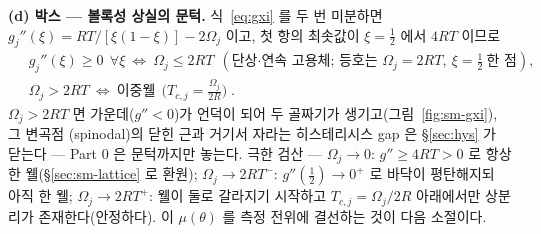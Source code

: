 \documentclass[11pt,a4paper]{article}
\begin{document}
\textbf{(d) 박스 --- 볼록성 상실의 문턱.} 식~\eqref{eq:gxi} 를 두 번 미분하면
$g_j''(\xi)=RT/[\xi(1-\xi)]-2\Omega_j$ 이고, 첫 항의 최솟값이 $\xi=\tfrac12$ 에서 $4RT$ 이므로
\begin{equation}
\boxed{\;
\begin{aligned}
&g_j''(\xi)\ge0\ \ \forall\xi\ \Longleftrightarrow\ \Omega_j\le2RT\ \ (\text{단상·연속 고용체; 등호는 }\Omega_j{=}2RT,\ \xi{=}\tfrac12\ \text{한 점}),\\
&\Omega_j>2RT\ \Longleftrightarrow\ \text{이중웰}\ \ \Big(T_{c,j}=\frac{\Omega_j}{2R}\Big)\;.
\end{aligned}}
\label{eq:sm-thresh}
\end{equation}
$\Omega_j>2RT$ 면 가운데($g''<0$)가 언덕이 되어 두 골짜기가 생기고(그림~\ref{fig:sm-gxi}), 그 변곡점
(spinodal)의 닫힌 근과 거기서 자라는 히스테리시스 gap 은 \S\ref{sec:hys} 가 닫는다 --- Part 0 은 문턱까지만
놓는다. 극한 검산 --- $\Omega_j\to0$: $g''\ge4RT>0$ 로 항상 한 웰(\S\ref{sec:sm-lattice} 로 환원);
$\Omega_j\to2RT^-$: $g''(\tfrac12)\to0^+$ 로 바닥이 평탄해지되 아직 한 웰; $\Omega_j\to2RT^+$: 웰이 둘로
갈라지기 시작하고 $T_{c,j}=\Omega_j/2R$ 아래에서만 상분리가 존재한다(안정하다). 이 $\mu(\theta)$ 를 측정 전위에 결선하는
것이 다음 소절이다.
\end{document}
